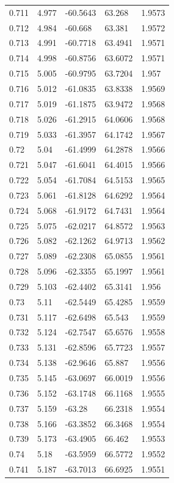 \begin{tabular}{lllll}
0.711 & 4.977 & -60.5643 & 63.268 & 1.9573 \\
0.712 & 4.984 & -60.668 & 63.381 & 1.9572 \\
0.713 & 4.991 & -60.7718 & 63.4941 & 1.9571 \\
0.714 & 4.998 & -60.8756 & 63.6072 & 1.9571 \\
0.715 & 5.005 & -60.9795 & 63.7204 & 1.957 \\
0.716 & 5.012 & -61.0835 & 63.8338 & 1.9569 \\
0.717 & 5.019 & -61.1875 & 63.9472 & 1.9568 \\
0.718 & 5.026 & -61.2915 & 64.0606 & 1.9568 \\
0.719 & 5.033 & -61.3957 & 64.1742 & 1.9567 \\
0.72 & 5.04 & -61.4999 & 64.2878 & 1.9566 \\
0.721 & 5.047 & -61.6041 & 64.4015 & 1.9566 \\
0.722 & 5.054 & -61.7084 & 64.5153 & 1.9565 \\
0.723 & 5.061 & -61.8128 & 64.6292 & 1.9564 \\
0.724 & 5.068 & -61.9172 & 64.7431 & 1.9564 \\
0.725 & 5.075 & -62.0217 & 64.8572 & 1.9563 \\
0.726 & 5.082 & -62.1262 & 64.9713 & 1.9562 \\
0.727 & 5.089 & -62.2308 & 65.0855 & 1.9561 \\
0.728 & 5.096 & -62.3355 & 65.1997 & 1.9561 \\
0.729 & 5.103 & -62.4402 & 65.3141 & 1.956 \\
0.73 & 5.11 & -62.5449 & 65.4285 & 1.9559 \\
0.731 & 5.117 & -62.6498 & 65.543 & 1.9559 \\
0.732 & 5.124 & -62.7547 & 65.6576 & 1.9558 \\
0.733 & 5.131 & -62.8596 & 65.7723 & 1.9557 \\
0.734 & 5.138 & -62.9646 & 65.887 & 1.9556 \\
0.735 & 5.145 & -63.0697 & 66.0019 & 1.9556 \\
0.736 & 5.152 & -63.1748 & 66.1168 & 1.9555 \\
0.737 & 5.159 & -63.28 & 66.2318 & 1.9554 \\
0.738 & 5.166 & -63.3852 & 66.3468 & 1.9554 \\
0.739 & 5.173 & -63.4905 & 66.462 & 1.9553 \\
0.74 & 5.18 & -63.5959 & 66.5772 & 1.9552 \\
0.741 & 5.187 & -63.7013 & 66.6925 & 1.9551 \\

\end{tabular}
